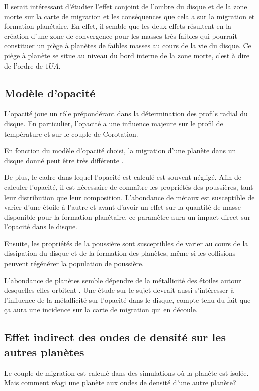 Il serait intéressant d'étudier l'effet conjoint de l'ombre du disque et de la zone morte sur la carte de migration et les conséquences que cela a sur la migration et formation planétaire. En effet, il semble que les deux effets résultent en la création d'une zone de convergence pour les masses très faibles  qui pourrait constituer un piège à planètes de faibles masses au cours de la vie du disque. Ce piège à planète se situe au niveau du bord interne de la zone morte, c'est à dire de l'ordre de $1\unit{UA}$.

\subsection{Modèle d'opacité}
L'opacité joue un rôle prépondérant dans la détermination des profils radial du disque. En particulier, l'opacité a une influence majeure sur le profil de température et sur le couple de Corotation. 

En fonction du modèle d'opacité choisi, la migration d'une planète dans un disque donné peut être très différente . 

De plus, le cadre dans lequel l'opacité est calculé est souvent négligé. Afin de calculer l'opacité, il est nécessaire de connaître les propriétés des poussières, tant leur distribution que leur composition. L'abondance de métaux est susceptible de varier d'une étoile à l'autre et avant d'avoir un effet sur la quantité de masse disponible pour la formation planétaire, ce paramètre aura un impact direct sur l'opacité dans le disque. 

Ensuite, les propriétés de la poussière sont susceptibles de varier au cours de la dissipation du disque et de la formation des planètes, même si les collisions peuvent régénérer la population de poussière.

L'abondance de planètes semble dépendre de la métallicité des étoiles autour desquelles elles orbitent \citep{fischer2005planet}. Une étude sur le sujet devrait aussi s'intéresser à l'influence de la métallicité sur l'opacité dans le disque, compte tenu du fait que ça aura une incidence sur la carte de migration qui en découle.

\subsection{Effet indirect des ondes de densité sur les autres planètes}
Le couple de migration est calculé dans des simulations où la planète est isolée. Mais comment réagi une planète aux ondes de densité d'une autre planète? 

